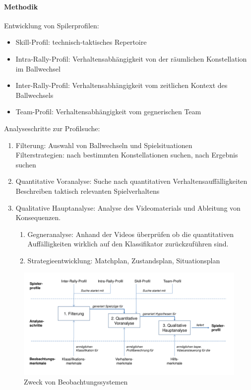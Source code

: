 \paragraph{Methodik}
Entwicklung von Spilerprofilen:
\begin{itemize}
  \item Skill-Profil: technisch-taktisches Repertoire
  \item Intra-Rally-Profil: Verhaltensabhängigkeit von der räumlichen Konstellation im Ballwechsel
  \item Inter-Rally-Profil: Verhaltensabhängigkeit vom zeitlichen Kontext des Ballwechsels
  \item Team-Profil: Verhaltensabhängigkeit vom gegnerischen Team
\end{itemize}
Analyseschritte zur Profilsuche:
\begin{enumerate}
  \item Filterung: Auswahl von Ballwechseln und Spielsituationen\\
    Filterstrategien: nach bestimmten Konstellationen suchen, nach Ergebnis suchen
  \item Quantitative Voranalyse: Suche nach quantitativen Verhaltensauffälligkeiten
    Beschreiben taktisch relevanten Spielverhaltens
  \item Qualitative Hauptanalyse: Analyse des Videomaterials und Ableitung von Konsequenzen.
    \begin{enumerate}
      \item Gegneranalyse: Anhand der Videos überprüfen ob die quantitativen Auffälligkeiten wirklich auf den Klassifikator zurückzuführen sind.
      \item Strategieentwicklung: Matchplan, Zustandsplan, Situationsplan
    \end{enumerate}
\end{enumerate}
\begin{figure}[H]
  \centering
  \caption{Zweck von Beobachtungssystemen}
  \includegraphics[width=.7\textwidth]{pictures/leistungsdiagnostik_beobachtungssystem_zweck.png}
\end{figure}
